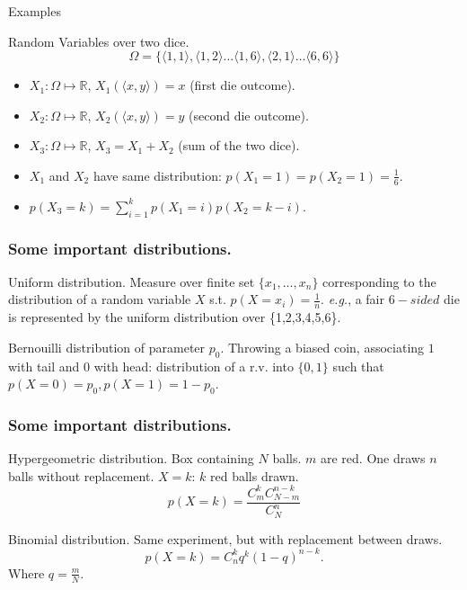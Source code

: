 \documentclass{beamer}
\begin{document}
\begin{frame}{Examples}
  \begin{exampleblock}{Random Variables over two dice.}
    \[\Omega = \{\langle 1,1 \rangle, \langle 1,2 \rangle \dots \langle 1,6 \rangle, \langle 2,1 \rangle \dots \langle 6,6 \rangle\}\]
    \begin{itemize}
    \item $X_1: \Omega \mapsto \mathbb{R}$, $X_1(\langle x,y \rangle) = x$ (first die outcome).
    \item $X_2: \Omega \mapsto \mathbb{R}$, $X_2(\langle x,y \rangle) = y$ (second die outcome).
    \item $X_3: \Omega \mapsto \mathbb{R}$, $X_3 = X_1 + X_2$ (sum of the two dice).
    \end{itemize}
  \end{exampleblock}

  \begin{itemize}
  \item $X_1$ and $X_2$ have same distribution: $p(X_1 = 1) = p(X_2 = 1) = \frac{1}{6}$.
  \item $p(X_3 = k) = \sum^{k}_{i=1} p(X_1 = i)p(X_2 = k - i)$. 
  \end{itemize}  
\end{frame}

\begin{frame}
  \frametitle{Some important distributions.}

  \begin{exampleblock}{Uniform distribution.}
    Measure over finite set $\{x_1, \dots, x_n\}$ corresponding to the distribution of a random variable $X$ s.t. $p(X = x_i) = \frac{1}{n}$. \emph{e.g.}, a fair $6-sided$ die is represented by the uniform distribution over \{1,2,3,4,5,6\}.
  \end{exampleblock}

  \begin{exampleblock}{Bernouilli distribution of parameter $p_0$.}
    Throwing a biased coin, associating $1$ with tail and $0$ with head: distribution of a r.v. into $\{0, 1\}$ such that $p(X = 0) = p_0, p(X = 1) = 1 - p_0$.
  \end{exampleblock}
\end{frame}

\begin{frame}
  \frametitle{Some important distributions.}
  \begin{exampleblock}{Hypergeometric distribution.}
    Box containing $N$ balls. $m$ are red. One draws $n$ balls without replacement. $X = k$: $k$ red balls drawn.
    \[
    p(X = k) = \frac{C^k_mC^{n-k}_{N-m}}{C^n_N}
    \]
  
  \end{exampleblock}

  \begin{exampleblock}{Binomial distribution.}
    Same experiment, but with replacement between draws.
    \[
    p(X = k) = C^k_nq^{k}(1 - q)^{n-k}.
    \]
    Where $q = \frac{m}{N}$.
  \end{exampleblock}
\end{frame}
\end{document}

